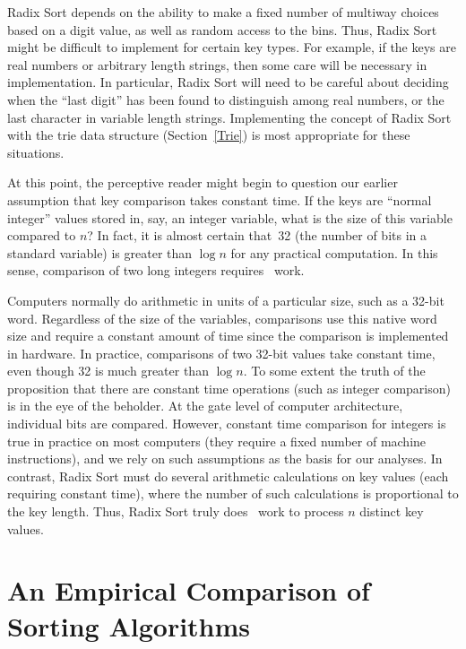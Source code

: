 Radix Sort depends on the ability to make a fixed number of multiway
choices based on a digit value, as well as random access to the bins.
Thus, Radix Sort might be difficult to implement for certain key types.
For example, if the keys are real numbers or arbitrary length strings,
then some care will be necessary in implementation.
In particular, Radix Sort will need to be careful about deciding when
the ``last digit'' has been found to distinguish among real numbers,
or the last character in variable length strings.
Implementing the concept of Radix Sort with the trie data
structure (Section~\ref{Trie}) is most appropriate for these
situations.

At this point, the perceptive reader might begin to question our
earlier assumption that key comparison takes constant time.
If the keys are ``normal integer'' values stored in, say, an integer
variable, what is the size of this variable compared to \(n\)?
In fact, it is almost certain that~32 (the number of bits in a
standard  variable) is
greater than \(\log n\) for any practical computation.
In this sense, comparison of two long integers requires \Omegalogn\
work.

Computers normally do arithmetic in units of a particular size, such
as a 32-bit word.
Regardless of the size of the variables, comparisons use this
native word size and require a constant amount of time since the
comparison is implemented in hardware.
In practice, comparisons of two 32-bit values take constant time, even
though 32 is much greater than \(\log n\).
To some extent the truth of the proposition that there are constant
time operations (such as integer comparison) is in the eye of the
beholder.
At the gate level of computer architecture, individual bits are
compared.
However, constant time comparison for integers is true in practice on
most computers (they require a fixed number of machine instructions),
and we rely on such assumptions as the basis for our analyses.
In contrast, Radix Sort must do several arithmetic
calculations on key values (each requiring constant time), where the
number of such calculations is proportional to the key length.
Thus, Radix Sort truly does \Omeganlogn\ work to process \(n\)
distinct key values.

\section{An Empirical Comparison of Sorting Algorithms}

